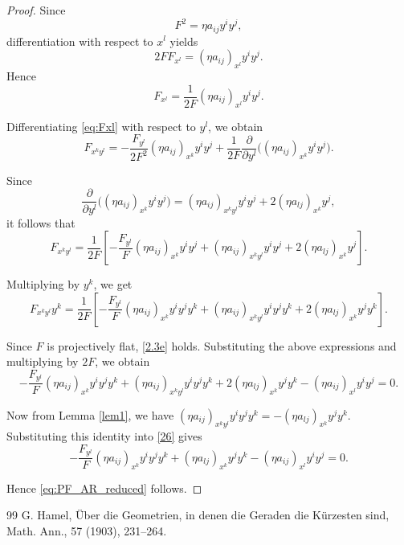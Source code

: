 \documentclass[10pt,a4paper]{amsart}
\begin{document}
								\begin{proof}
									Since
									\[
									F^2=\eta a_{ij}y^iy^j,
									\]
									differentiation with respect to \(x^l\) yields
									\[
									2FF_{x^l}
									=
									(\eta a_{ij})_{x^l}y^iy^j.
									\]
									Hence
									\begin{equation}
									F_{x^l}
									=
									\frac{1}{2F}
									(\eta a_{ij})_{x^l}y^iy^j.
									\label{eq:Fxl}
									\end{equation}
									
									Differentiating \eqref{eq:Fxl} with respect to \(y^l\), we obtain
									\[
									F_{x^ky^l}
									=
									-\frac{F_{y^l}}{2F^2}
									(\eta a_{ij})_{x^k}y^iy^j
									+\frac{1}{2F}
									\frac{\partial}{\partial y^l}
									\Big(
									(\eta a_{ij})_{x^k}y^iy^j
									\Big).
									\]
									
									Since
									\[
									\frac{\partial}{\partial y^l}
									\Big(
									(\eta a_{ij})_{x^k}y^iy^j
									\Big)
									=
									(\eta a_{ij})_{x^ky^l}y^iy^j
									+
									2(\eta a_{lj})_{x^k}y^j,
									\]
									it follows that
									\[
									F_{x^ky^l}
									=
									\frac{1}{2F}
									\left[
									-\frac{F_{y^l}}{F}
									(\eta a_{ij})_{x^k}y^iy^j
									+
									(\eta a_{ij})_{x^ky^l}y^iy^j
									+
									2(\eta a_{lj})_{x^k}y^j
									\right].
									\]
									
									Multiplying by \(y^k\), we get
									\[
									F_{x^ky^l}y^k
									=
									\frac{1}{2F}
									\left[
									-\frac{F_{y^l}}{F}
									(\eta a_{ij})_{x^k}y^iy^jy^k
									+
									(\eta a_{ij})_{x^ky^l}y^iy^jy^k
									+
									2(\eta a_{lj})_{x^k}y^jy^k
									\right].
									\]
									
									Since \(F\) is projectively flat, \eqref{2.3e}
									holds. Substituting the above expressions and multiplying by \(2F\), we obtain
									\begin{equation}\label{26}
									-\frac{F_{y^l}}{F}
									(\eta a_{ij})_{x^k}y^iy^jy^k
									+
									(\eta a_{ij})_{x^ky^l}y^iy^jy^k
									+
									2(\eta a_{lj})_{x^k}y^jy^k
									-
									(\eta a_{ij})_{x^l}y^iy^j
									=0.   
									\end{equation}
									
									Now from Lemma \ref{lem1}, we have
									$(\eta a_{ij})_{x^ky^l}y^iy^jy^k
									=
									-(\eta a_{lj})_{x^k}y^jy^k.$
									Substituting this identity into \eqref{26} gives
									\[
									-\frac{F_{y^l}}{F}
									(\eta a_{ij})_{x^k}y^iy^jy^k
									+
									(\eta a_{lj})_{x^k}y^jy^k
									-
									(\eta a_{ij})_{x^l}y^iy^j
									=0.
									\]
									
									Hence \eqref{eq:PF_AR_reduced} follows.
								\end{proof}
								

\begin{thebibliography}{99}
 G. Hamel, Über die Geometrien, in denen die Geraden die Kürzesten sind, Math. Ann., 57 (1903), 231--264.
\end{thebibliography}
\end{document}
